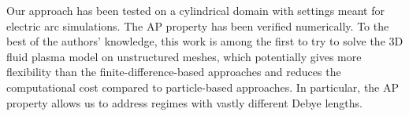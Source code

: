 \documentclass{article}
\begin{document}
Our approach has been tested on a cylindrical domain with settings meant for electric arc
simulations. The AP property has been verified numerically. To the best of the authors'
knowledge, this work is among the first to try to solve the 3D fluid plasma model on
unstructured meshes, which potentially gives more flexibility than the
finite-difference-based approaches and reduces the computational cost compared to
particle-based approaches. In particular, the AP property allows us to address regimes
with vastly different Debye lengths.


\end{document}
